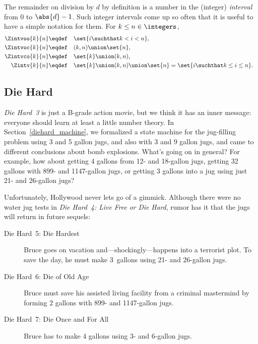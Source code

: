 The remainder on division by $d$ by definition is a number in the
(integer) \emph{interval} from 0 to $\abs{d}-1$.  Such integer
intervals come up so often that it is useful to have a simple notation
for them.  For $k \leq n \in \integers$,
\begin{align*}
\Zintvoo{k}{n} & \eqdef\quad \set{i \suchthat k < i < n},\\
\Zintvoc{k}{n} & \eqdef\quad (k,n) \union \set{n},\\ 
\Zintvco{k}{n} & \eqdef\quad \set{k} \union (k,n),\\
\Zintv{k}{n}   & \eqdef\quad \set{k} \union (k,n) \union \set{n} = \set{i \suchthat k \leq i \leq n}.
\end{align*}

\subsection{Die Hard}

\emph{Die Hard~3} is just a B-grade action movie, but we think it has
an inner message: everyone should learn at least a little number
theory.  In Section~\ref{diehard_machine}, we formalized a state
machine for the  jug-filling problem using 3 and 5
gallon jugs, and also with 3 and 9 gallon jugs, and came to different
conclusions about bomb explosions.  What's going on in general?  For
example, how about getting 4 gallons from 12- and 18-gallon jugs,
getting 32 gallons with 899- and 1147-gallon jugs, or getting 3
gallons into a jug using just 21- and 26-gallon jugs?

\begin{editingnotes}
Unfortunately, Hollywood never lets go of a gimmick.  Although there
were no water jug tests in \emph{Die Hard~4: Live Free or Die Hard},
rumor has it that the jugs will return in future sequels:
\begin{description}

\item[Die Hard~5: Die Hardest] Bruce goes on vacation and---shockingly---happens into a
  terrorist plot.  To save the day, he must make 3~gallons using 21- and 26-gallon jugs.

\item[Die Hard~6: Die of Old Age] Bruce must save his assisted living facility from a
  criminal mastermind by forming 2 gallons with 899- and 1147-gallon jugs.

\item[Die Hard~7: Die Once and For All] Bruce has to make 4 gallons using 3- and 6-gallon
  jugs.

\end{description}
\end{editingnotes}

